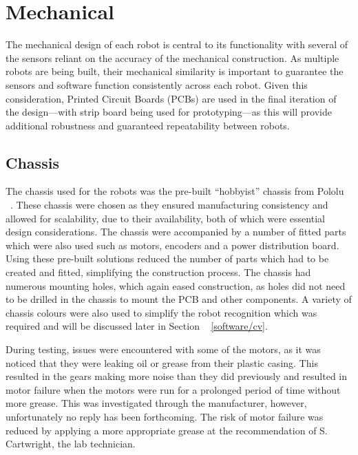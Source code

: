 
\chapter{Mechanical}\label{mechanical}

The mechanical design of each robot is central to its 
functionality with several of the sensors
reliant on the accuracy of the mechanical construction. As 
multiple robots are being built, 
their mechanical similarity is important to guarantee the 
sensors and software function consistently across each robot. 
Given this consideration, Printed Circuit Boards (PCBs) are used in 
the final iteration of the design---with strip board being used for 
prototyping---as this will provide additional robustness and 
guaranteed repeatability between robots.

\section{Chassis}\label{mech/chassis}
The chassis used for the robots was the pre-built ``hobbyist'' 
chassis from Pololu ~\cite{pololuchassis}. These chassis were 
chosen as they ensured manufacturing  consistency and allowed 
for scalability, due to their availability, both of which were 
essential design considerations. The chassis were accompanied by 
a number of fitted parts which were also used such as motors, 
encoders and a power distribution board. Using these pre-built 
solutions reduced the number of parts which had to be created 
and fitted, simplifying the construction process.
The chassis had numerous mounting holes, which again eased 
construction, as holes did not need to be drilled in the chassis 
to mount the PCB and other components. A variety of chassis 
colours were also used to simplify the robot recognition which 
was required and will be discussed later in Section ~
\ref{software/cv}. 

During testing, issues were encountered with some of the motors, 
as it was noticed that they 
were leaking oil or grease from their plastic casing. This 
resulted in the gears making more noise than they did previously 
and resulted in motor failure when the motors were run for a 
prolonged period of time without more grease. This was 
investigated through the manufacturer, however, unfortunately no 
reply has been forthcoming. The risk of motor failure was 
reduced by applying a more appropriate grease at the 
recommendation of S. Cartwright, the lab technician.  

